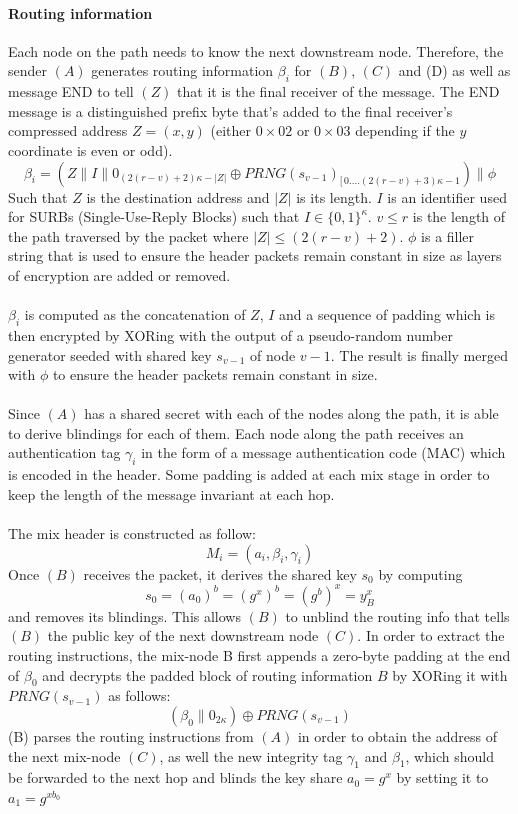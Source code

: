 \paragraph{Routing information}
Each node on the path needs to know the next downstream node. Therefore, the sender $(A)$ generates routing information $\beta_i$ for $(B)$, $(C)$ and (D) as well as message END to tell $(Z)$ that it is the final receiver of the message. The END message is a distinguished prefix byte that's added to the final receiver's compressed address $Z=(x,y)$ (either $0\times02$ or $0\times03$ depending if the $y$ coordinate is even or odd).
$$\beta_i=(Z\|I\|0_{(2(r-v)+2)\kappa-|Z|}\oplus PRNG(s_{v-1})_{[ \,0....(2(r-v)+3)\kappa-1})\|\phi$$
Such that $Z$ is the destination address and $|Z|$ is its length. $I$ is an identifier used for SURBs (Single-Use-Reply Blocks) such that $I \in \{0, 1\}^\kappa$.
$v\leq r$ is the length of the path traversed by the packet where $|Z| \leq (2(r - v) + 2)$. $\phi$ is a filler string that is used to ensure the header packets remain constant in size as layers of encryption are added or removed. 
\\~\\$\beta_i$ is computed as the concatenation of $Z$, $I$ and a sequence of padding which is then encrypted by XORing with the output of a pseudo-random number generator seeded with shared key $s_{v-1}$ of node $v-1$. The result is finally merged with $\phi$ to ensure the header packets remain constant in size.
\\~\\Since $(A)$ has a shared secret with each of the nodes along the path, it is able to derive blindings for each of them. 
\newline Each node along the path receives an authentication tag $\gamma_i$ in the form of a message authentication code (MAC)
which is encoded in the header.
\newline Some padding is added at each mix stage in order to keep the length of the message invariant at each hop. 
\\~\\The mix header is constructed as follow: $$M_i=(a_i,\beta_i,\gamma_i)$$ 
\newline Once $(B)$ receives the packet, it derives the shared key $s_0$ by computing $$s_0=(a_0)^b=(g^x)^b=(g^b)^x=y^x_B$$ and removes its blindings. This allows $(B)$ to unblind the routing info that tells $(B)$ the public key of the next downstream node $(C)$. In order to extract the routing instructions, the mix-node B first appends a zero-byte padding at the end of $\beta_0$ and decrypts the padded block of routing information $B$ by XORing it with $PRNG(s_{v-1})$ as follows:
$$(\beta_0\|0_{2\kappa})\oplus PRNG(s_{v-1})$$
(B) parses the routing instructions from $(A)$ in order to obtain the address of the next mix-node $(C)$, as well the new integrity tag $\gamma_1$ and $\beta_1$, which should be forwarded to the next hop and blinds the key share $a_0=g^x$ by setting it to $a_1=g^{xb_0}$
